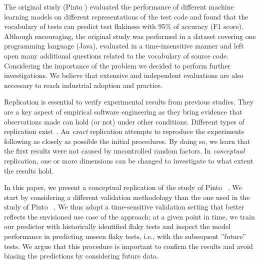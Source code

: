 The original study (Pinto \etal) evaluated the performance of different machine learning models on different representations of the test code and found that the vocabulary of tests can predict test flakiness with 95\% of accuracy (F1 score). %
Although encouraging, the original study was performed in a dataset covering one programming language (Java), evaluated in a time-insensitive manner and left open many additional questions related to the vocabulary of source code. 
Considering the importance of the problem we decided to perform further investigations. We believe that extensive and independent evaluations are also necessary to reach industrial adoption and practice. 


Replication is essential to verify experimental results from previous studies. They are a key aspect of empirical software engineering as they bring evidence that observations made can hold (or not) under other conditions. Different types of replication exist~\cite{Shull2008,Gomez2014}. An \textit{exact} replication attempts to reproduce the experiments following as closely as possible the initial procedures. By doing so, we learn that the first results were not caused by uncontrolled random factors. In \textit{conceptual} replication, one or more dimensions can be changed to investigate to what extent the results hold. 

In this paper, we present a conceptual replication of the study of Pinto \etal~\cite{Pinto2020}. %
We start by considering a different validation methodology than the one used in the study of Pinto \etal~\cite{Pinto2020}. We thus adopt a time-sensitive validation setting that better reflects the envisioned use case of the approach; at a given point in time, we train our predictor with historically identified flaky tests and inspect the model performance in predicting unseen flaky tests, i.e., with the subsequent ''future'' tests.  
We argue that this procedure is important to confirm the results and avoid biasing the predictions by considering future data. 

